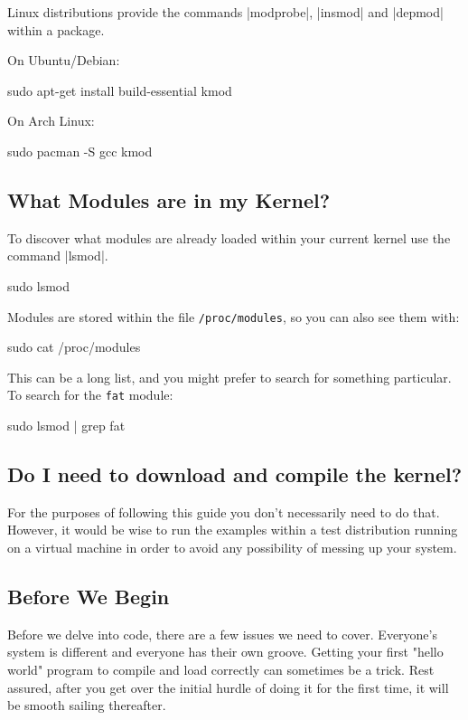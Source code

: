 \documentclass[10pt, oneside]{book}
\begin{document}
Linux distributions provide the commands \sh|modprobe|, \sh|insmod| and \sh|depmod| within a package.

On Ubuntu/Debian:
\begin{codebash}
sudo apt-get install build-essential kmod
\end{codebash}

On Arch Linux:
\begin{codebash}
sudo pacman -S gcc kmod
\end{codebash}

\subsection{What Modules are in my Kernel?}
\label{sec:modutils}

To discover what modules are already loaded within your current kernel use the command \sh|lsmod|.
\begin{codebash}
sudo lsmod
\end{codebash}

Modules are stored within the file \verb|/proc/modules|, so you can also see them with:
\begin{codebash}
sudo cat /proc/modules
\end{codebash}

This can be a long list, and you might prefer to search for something particular.
To search for the \verb|fat| module:
\begin{codebash}
sudo lsmod | grep fat
\end{codebash}

\subsection{Do I need to download and compile the kernel?}
\label{sec:buildkernel}
For the purposes of following this guide you don't necessarily need to do that.
However, it would be wise to run the examples within a test distribution running on a virtual machine in order to avoid any possibility of messing up your system.

\subsection{Before We Begin}
\label{sec:preparation}
Before we delve into code, there are a few issues we need to cover.
Everyone's system is different and everyone has their own groove.
Getting your first "hello world" program to compile and load correctly can sometimes be a trick.
Rest assured, after you get over the initial hurdle of doing it for the first time, it will be smooth sailing thereafter.
\end{document}
